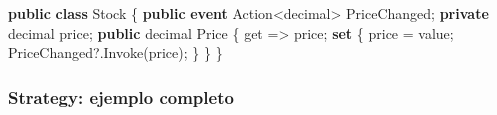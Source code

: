\documentclass[
  11pt,
  letterpaper,
]{article}
\newenvironment{Shaded}{\begin{snugshade}}{\end{snugshade}}
\newcommand{\DataTypeTok}[1]{\textcolor[rgb]{0.68,0.00,0.00}{#1}}
\newcommand{\FunctionTok}[1]{\textcolor[rgb]{0.28,0.35,0.67}{#1}}
\newcommand{\KeywordTok}[1]{\textcolor[rgb]{0.00,0.23,0.31}{\textbf{#1}}}
\newcommand{\NormalTok}[1]{\textcolor[rgb]{0.00,0.23,0.31}{#1}}
\newcommand{\OperatorTok}[1]{\textcolor[rgb]{0.37,0.37,0.37}{#1}}
\begin{document}
\begin{Shaded}
\begin{Highlighting}[]
\KeywordTok{public} \KeywordTok{class}\NormalTok{ Stock}
\OperatorTok{\{}
    \KeywordTok{public} \KeywordTok{event}\NormalTok{ Action}\OperatorTok{\textless{}}\DataTypeTok{decimal}\OperatorTok{\textgreater{}}\NormalTok{ PriceChanged}\OperatorTok{;}
    \KeywordTok{private} \DataTypeTok{decimal}\NormalTok{ price}\OperatorTok{;}
    \KeywordTok{public} \DataTypeTok{decimal}\NormalTok{ Price}
    \OperatorTok{\{}
\NormalTok{        get }\OperatorTok{=\textgreater{}}\NormalTok{ price}\OperatorTok{;}
        \KeywordTok{set} \OperatorTok{\{}
\NormalTok{            price }\OperatorTok{=}\NormalTok{ value}\OperatorTok{;}
\NormalTok{            PriceChanged}\OperatorTok{?.}\FunctionTok{Invoke}\OperatorTok{(}\NormalTok{price}\OperatorTok{);}
        \OperatorTok{\}}
    \OperatorTok{\}}
\OperatorTok{\}}
\end{Highlighting}
\end{Shaded}

\subsubsection{Strategy: ejemplo
completo}\label{strategy-ejemplo-completo}
\end{document}
